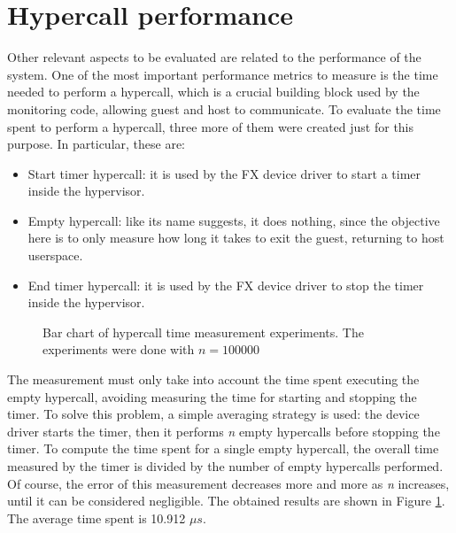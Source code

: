 \section{Hypercall performance}
Other relevant aspects to be evaluated are related to the performance of the system. One of the most important performance metrics to measure is the time needed to perform a hypercall, which is a crucial building block used by the monitoring code, allowing guest and host to communicate. To evaluate the time spent to perform a hypercall, three more of them were created just for this purpose. In particular, these are: 
\begin{itemize}
    \item Start timer hypercall: it is used by the FX device driver to start a timer inside the hypervisor.
    \item Empty hypercall: like its name suggests, it does nothing, since the objective here is to only measure how long it takes to exit the guest, returning to host userspace. 
    \item End timer hypercall: it is used by the FX device driver to stop the timer inside the hypervisor. 
\end{itemize}
\begin{figure}[t]
    \centering
    
    \caption{Bar chart of hypercall time measurement experiments. The experiments were done with $n = 100000$ }
    \label{fig:perf-hypercall}
\end{figure}

The measurement must only take into account the time spent executing the empty hypercall, avoiding measuring the time for starting and stopping the timer. To solve this problem, a simple averaging strategy is used: the device driver starts the timer, then it performs \emph{n} empty hypercalls before stopping the timer. To compute the time spent for a single empty hypercall, the overall time measured by the timer is divided by the number of empty hypercalls performed. Of course, the error of this measurement decreases more and more as \emph{n} increases, until it can be considered negligible. The obtained results are shown in Figure \ref{fig:perf-hypercall}. The average time spent is 10.912 $\mu s$. 
